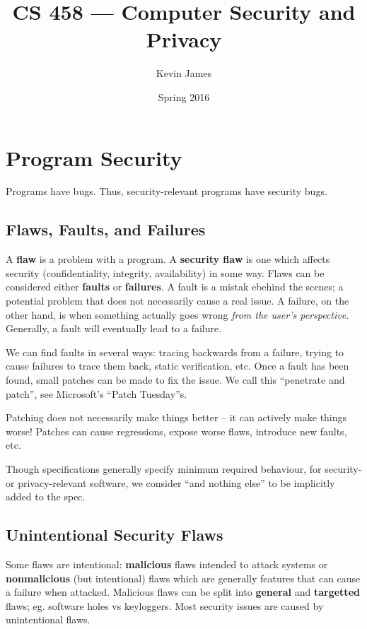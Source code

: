 \documentclass[12pt]{article}
\begin{document}
\title{CS 458 --- Computer Security and Privacy}
\author{Kevin James}
\date{\vspace{-2ex}Spring 2016}
\maketitle\HRule

\tableofcontents
\newpage

\section{Program Security}
Programs have bugs. Thus, security-relevant programs have security bugs.

\subsection{Flaws, Faults, and Failures}
A {\bf flaw} is a problem with a program. A {\bf security flaw} is one which affects security (confidentiality, integrity, availability) in some way. Flaws can be considered either {\bf faults} or {\bf failures}. A fault is a mistak ebehind the scenes; a potential problem that does not necessarily cause a real issue. A failure, on the other hand, is when something actually goes wrong {\it from the user's perspective}. Generally, a fault will eventually lead to a failure.

We can find faults in several ways: tracing backwards from a failure, trying to cause failures to trace them back, static verification, etc. Once a fault has been found, small patches can be made to fix the issue. We call this ``penetrate and patch'', see Microsoft's ``Patch Tuesday''s.

Patching does not necessarily make things better -- it can actively make things worse! Patches can cause regressions, expose worse flaws, introduce new faults, etc.

Though specifications generally specify minimum required behaviour, for security- or privacy-relevant software, we consider ``and nothing else'' to be implicitly added to the spec.

\subsection{Unintentional Security Flaws}
Some flaws are intentional: {\bf malicious} flaws intended to attack systems or {\bf nonmalicious} (but intentional) flaws which are generally features that can cause a failure when attacked. Malicious flaws can be split into {\bf general} and {\bf targetted} flaws; eg. software holes vs keyloggers. Most security issues are caused by unintentional flaws.
\end{document}

